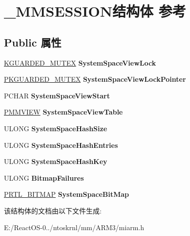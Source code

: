 \hypertarget{struct___m_m_s_e_s_s_i_o_n}{}\section{\+\_\+\+M\+M\+S\+E\+S\+S\+I\+O\+N结构体 参考}
\label{struct___m_m_s_e_s_s_i_o_n}
\subsection*{Public 属性}
\begin{DoxyCompactItemize}
\item 
\mbox{\label{struct___m_m_s_e_s_s_i_o_n_acb2d91dc6aedf4abab6982a97a23f2a6}} 
\hyperlink{struct___k_g_u_a_r_d_e_d___m_u_t_e_x}{K\+G\+U\+A\+R\+D\+E\+D\+\_\+\+M\+U\+T\+EX} {\bfseries System\+Space\+View\+Lock}
\item 
\mbox{\label{struct___m_m_s_e_s_s_i_o_n_a6e46b078e5963600f1993d1a78dadbf6}} 
\hyperlink{struct___k_g_u_a_r_d_e_d___m_u_t_e_x}{P\+K\+G\+U\+A\+R\+D\+E\+D\+\_\+\+M\+U\+T\+EX} {\bfseries System\+Space\+View\+Lock\+Pointer}
\item 
\mbox{\label{struct___m_m_s_e_s_s_i_o_n_a8a9c0ccdcbeec4150965cae130906ff3}} 
P\+C\+H\+AR {\bfseries System\+Space\+View\+Start}
\item 
\mbox{\label{struct___m_m_s_e_s_s_i_o_n_a8f5c4e498ae7ff7ffbd228044908863b}} 
\hyperlink{struct___m_m_v_i_e_w}{P\+M\+M\+V\+I\+EW} {\bfseries System\+Space\+View\+Table}
\item 
\mbox{\label{struct___m_m_s_e_s_s_i_o_n_a8c90d81a8771faba7b38fea0c55dd2bd}} 
U\+L\+O\+NG {\bfseries System\+Space\+Hash\+Size}
\item 
\mbox{\label{struct___m_m_s_e_s_s_i_o_n_a143c8ae8f9d71d70770ec05add64bf89}} 
U\+L\+O\+NG {\bfseries System\+Space\+Hash\+Entries}
\item 
\mbox{\label{struct___m_m_s_e_s_s_i_o_n_a0006e31589bcf77dad036e1eff1dd320}} 
U\+L\+O\+NG {\bfseries System\+Space\+Hash\+Key}
\item 
\mbox{\label{struct___m_m_s_e_s_s_i_o_n_a45ff0c95e9b875792a0e9af41777f9a5}} 
U\+L\+O\+NG {\bfseries Bitmap\+Failures}
\item 
\mbox{\label{struct___m_m_s_e_s_s_i_o_n_a8325a079d716fe6c3575aa996affc4ab}} 
\hyperlink{struct___r_t_l___b_i_t_m_a_p}{P\+R\+T\+L\+\_\+\+B\+I\+T\+M\+AP} {\bfseries System\+Space\+Bit\+Map}
\end{DoxyCompactItemize}


该结构体的文档由以下文件生成\+:\begin{DoxyCompactItemize}
\item 
E\+:/\+React\+O\+S-\/0../ntoskrnl/mm/\+A\+R\+M3/miarm.\+h\end{DoxyCompactItemize}
